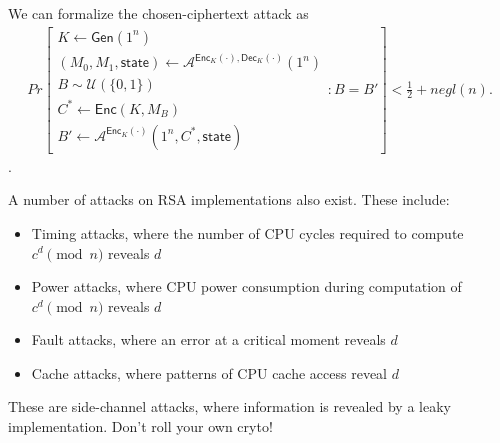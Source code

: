 \documentclass[10pt]{article}
\begin{document}
We can formalize the chosen-ciphertext attack as
\begin{align}
  Pr \left[
  \begin{array}{l}
    K \leftarrow \textsf{Gen}(1^n) \\
    (M_0, M_1, \textsf{state}) \leftarrow \mathcal A^{\textsf{Enc}_K(\cdot),\textsf{Dec}_K(\cdot)}(1^n) \\
    B \sim \mathcal U(\{0,1\}) \\
    C^* \leftarrow \textsf{Enc}(K,M_B) \\
    B' \leftarrow \mathcal A^{\textsf{Enc}_K(\cdot)}(1^n,C^*,\textsf{state})
  \end{array}
  : B = B'
  \right]
  < \frac{1}{2} + negl(n).
\end{align}.

A number of attacks on RSA implementations also exist. These include:
\begin{itemize}
	\item Timing attacks, where the number of CPU cycles required to compute $c^d \pmod n$ reveals $d$
	\item Power attacks, where CPU power consumption during computation of $c^d \pmod n$ reveals $d$
	\item Fault attacks, where an error at a critical moment reveals $d$
	\item Cache attacks, where patterns of CPU cache access reveal $d$
\end{itemize}

These are side-channel attacks, where information is revealed by a leaky implementation. Don't roll your own cryto!
\end{document}
